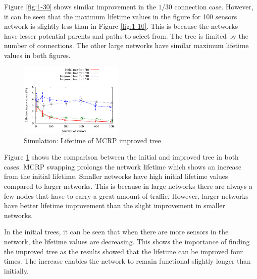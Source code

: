 Figure \ref{fig:1-30} shows similar improvement in the $1/30$ connection case. However, it can be seen that the maximum lifetime values in the figure for 100 sensors network is slightly less than in Figure \ref{fig:1-10}. This is because the networks have lesser potential parents and paths to select from. The tree is limited by the number of connections. The other large networks have similar maximum lifetime values in both figures.

\begin{figure}
\centering
\includegraphics[width=0.45\textwidth]{figures/maxmin.pdf}
\caption{Simulation: Lifetime of MCRP improved tree}
\label{fig:nodes-maxmin}
\end{figure}

Figure \ref{fig:nodes-maxmin} shows the comparison between the initial and improved tree in both cases. MCRP swapping prolongs the network lifetime which shows an increase from the initial lifetime. Smaller networks have high initial lifetime values compared to larger networks.  This is because in large networks there are always a few nodes that have to carry a great amount of traffic.  However, larger networks have better lifetime improvement than the slight improvement in smaller networks.

In the initial trees, it can be seen that when there are more sensors in the network, the lifetime values are decreasing. This shows the importance of finding the improved tree as the results showed that the lifetime can be improved four times. The increase enables the network to remain functional slightly longer than initially. 

